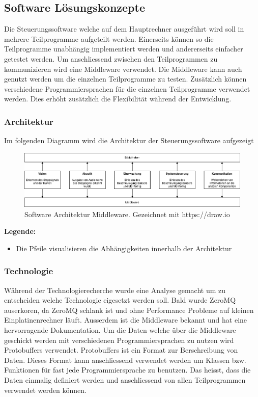 \documentclass[../../main.tex]{subfiles}
\begin{document}
\subsection{Software Lösungskonzepte}
Die Steuerungssoftware welche auf dem Hauptrechner ausgeführt wird soll in mehrere Teilprogramme aufgeteilt werden.
Einerseits können so die Teilprogramme unabhängig implementiert werden und andererseits einfacher getestet werden.
Um anschliessend zwischen den Teilprogrammen zu kommunizieren wird eine Middleware verwendet. Die Middleware kann auch genutzt werden
um die einzelnen Teilprogramme zu testen. Zusätzlich können verschiedene Programmiersprachen für die einzelnen Teilprogramme verwendet werden. 
Dies erhöht zusätzlich die Flexibilität während der Entwicklung.

\subsubsection{Architektur}
Im folgenden Diagramm wird die Architektur der Steuerungssoftware aufgezeigt
\begin{figure}[H] %
    \centering
    \includegraphics[width=1.0\textwidth]{drawings/ArchitekturDiagramm/SW_Architektur_Middleware.png}
    \caption {Software Architektur Middleware. Gezeichnet mit https://draw.io}
\end{figure}

\textbf{Legende:}
\begin{itemize}
    \item Die Pfeile visualisieren die Abhängigkeiten innerhalb der Architektur
\end{itemize}

\subsubsection{Technologie}
Während der Technologierecherche wurde eine Analyse gemacht um zu entscheiden welche Technologie eigesetzt werden soll. Bald wurde ZeroMQ
auserkoren, da ZeroMQ schlank ist und ohne Performance Probleme auf kleinen Einplatinenrechner läuft. Ausserdem ist die Middleware bekannt
und hat eine hervorragende Dokumentation. Um die Daten welche über die Middleware geschickt werden mit verschiedenen Programmiersprachen zu
nutzen wird Protobuffers verwendet. Protobuffers ist ein Format zur Berschreibung von Daten. Dieses Format kann anschliessend verwendet werden um
Klassen bzw. Funktionen für fast jede Programmiersprache zu benutzen. Das heisst, dass die Daten einmalig definiert werden und anschliessend von
allen Teilprogrammen verwendet werden können.
\end{document}

